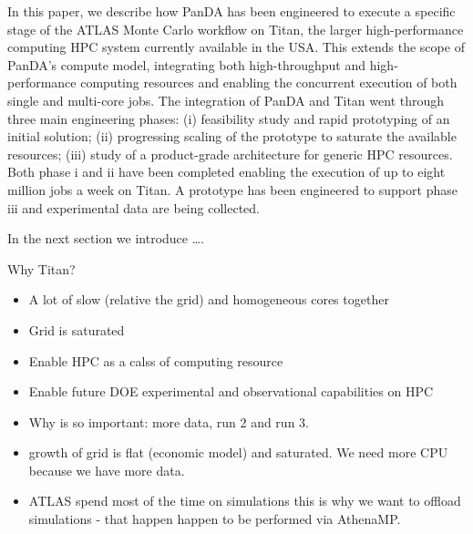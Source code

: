 In this paper, we describe how PanDA has been engineered to execute a specific
stage of the ATLAS Monte Carlo workflow on Titan, the larger high-performance
computing HPC system currently available in the USA\@. This extends
the scope of PanDA's compute model, integrating both high-throughput and
high-performance computing resources and enabling the concurrent execution of
both  single and multi-core jobs. The integration of PanDA and Titan went
through three main engineering phases: (i) feasibility study and rapid
prototyping of an initial solution; (ii) progressing scaling of the  prototype
to saturate the available resources; (iii) study of a product-grade architecture
for generic HPC resources. Both phase i and ii have been completed enabling the
execution of up to eight million jobs a week on Titan. A prototype has been
engineered to support phase iii and experimental data are being collected.

In the next section we introduce \ldots.

Why Titan?
\begin{itemize}
    \item A lot of slow (relative the grid) and homogeneous cores together
    \item Grid is saturated
    \item Enable HPC as a calss of computing resource
    \item Enable future DOE experimental and observational capabilities on HPC
    \item Why is so important: more data, run 2 and run 3.
    \item growth of grid is flat (economic model) and saturated. We need more CPU because we have more data.
    \item ATLAS spend most of the time on simulations this is why we want to offload simulations - that happen happen to be performed via AthenaMP.
\end{itemize}

